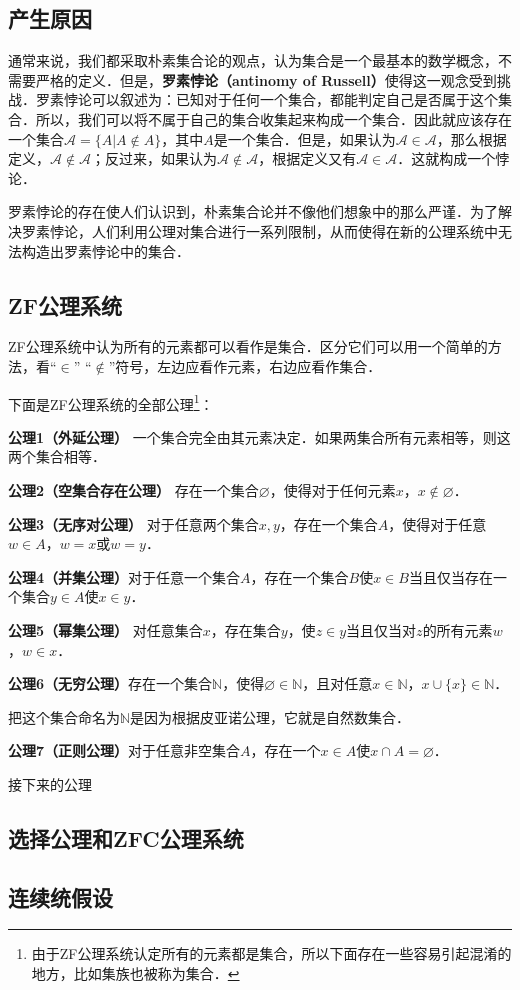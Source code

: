\begin{issues}
\issueTODO
\end{issues}

\subsection{产生原因}
通常来说，我们都采取朴素集合论的观点，认为集合是一个最基本的数学概念，不需要严格的定义．但是，\textbf{罗素悖论（antinomy of Russell）}使得这一观念受到挑战．罗素悖论可以叙述为：已知对于任何一个集合，都能判定自己是否属于这个集合．所以，我们可以将不属于自己的集合收集起来构成一个集合．因此就应该存在一个集合$\mathcal{A}=\{A|A\notin A\}$，其中$A$是一个集合．但是，如果认为$\mathcal{A}\in\mathcal{A}$，那么根据定义，$\mathcal{A}\notin\mathcal{A}$；反过来，如果认为$\mathcal{A}\notin\mathcal{A}$，根据定义又有$\mathcal{A}\in\mathcal{A}$．这就构成一个悖论．

罗素悖论的存在使人们认识到，朴素集合论并不像他们想象中的那么严谨．为了解决罗素悖论，人们利用公理对集合进行一系列限制，从而使得在新的公理系统中无法构造出罗素悖论中的集合．

\subsection{ZF公理系统}
ZF公理系统中认为所有的元素都可以看作是集合．区分它们可以用一个简单的方法，看“$\in$” “$\notin$”符号，左边应看作元素，右边应看作集合．

下面是ZF公理系统的全部公理\footnote{由于ZF公理系统认定所有的元素都是集合，所以下面存在一些容易引起混淆的地方，比如集族也被称为集合．}：

\textbf{公理1（外延公理）} 一个集合完全由其元素决定．如果两集合所有元素相等，则这两个集合相等．

\textbf{公理2（空集合存在公理）} 存在一个集合$\varnothing$，使得对于任何元素$x$，$x\notin\varnothing$．

\textbf{公理3（无序对公理）} 对于任意两个集合$x,y$，存在一个集合$A$，使得对于任意$w\in A$，$w=x$或$w=y$．

\textbf{公理4（并集公理）}对于任意一个集合$A$，存在一个集合$B$使$x\in B$当且仅当存在一个集合$y\in A$使$x\in y$．

\textbf{公理5（幂集公理）} 对任意集合$x$，存在集合$y$，使$z\in y$当且仅当对$z$的所有元素$w$，$w\in x$．

\textbf{公理6（无穷公理）}存在一个集合$\mathbb{N}$，使得$\varnothing\in\mathbb{N}$，且对任意$x\in \mathbb{N}$，$x\cup\{x\}\in\mathbb{N}$．

把这个集合命名为$\mathbb{N}$是因为根据皮亚诺公理，它就是自然数集合．

\textbf{公理7（正则公理）}对于任意非空集合$A$，存在一个$x\in A$使$x\cap A=\varnothing$．

接下来的公理

\subsection{选择公理和ZFC公理系统}

\subsection{连续统假设}



